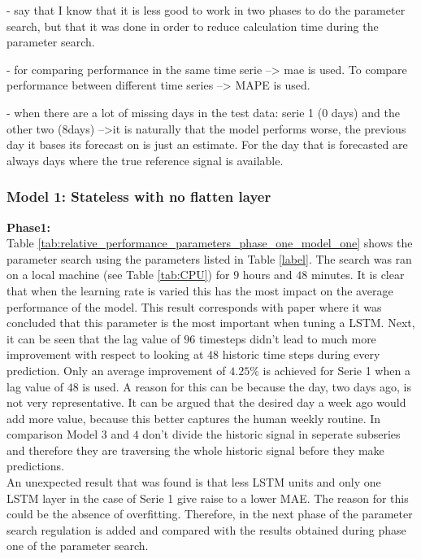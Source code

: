 - say that I know that it is less good to work in two phases to do the parameter search, but that it was done in order to reduce calculation time during the parameter search. 

- for comparing performance in the same time serie --> mae is used. To compare performance between different time series --> MAPE is used. 

- when there are a lot of missing days in the test data: serie 1 (0 days) and the other two (8days) -->it is naturally that the model performs worse, the previous day it bases its forecast on is just an estimate. For the day that is forecasted are always days where the true reference signal is available. 


\subsubsection{Model 1: Stateless with no flatten layer}



\textbf{Phase1:}\\
Table \ref{tab:relative_performance_parameters_phase_one_model_one} shows the parameter search using the parameters listed in Table \ref{label}. The search was ran on a local machine (see Table \ref{tab:CPU}) for $ 9 $ hours and $ 48 $ minutes. It is clear that when the learning rate is varied this has the most impact on the average performance of the model. This result corresponds with paper \cite{Greff2017a} where it was concluded that this parameter is the most important when tuning a LSTM. Next, it can be seen that the lag value of $ 96 $ timesteps didn't lead to much more improvement with respect to looking at $ 48 $ historic time steps during every prediction. Only an average improvement of $ 4.25 \% $ is achieved for Serie 1 when a lag value of $ 48 $ is used. A reason for this can be because the day, two days ago, is not very representative. It can be argued that the desired day a week ago would add more value, because this better captures the human weekly routine. In comparison Model $ 3 $ and $ 4 $ don't divide the historic signal in seperate subseries and therefore they are traversing the whole historic signal before they make predictions.\\
An unexpected result that was found is that less LSTM units and only one LSTM layer in the case of Serie 1 give raise to a lower MAE. The reason for this could be the absence of overfitting. Therefore, in the next phase of the parameter search regulation is added and compared with the results obtained during phase one of the parameter search. 

